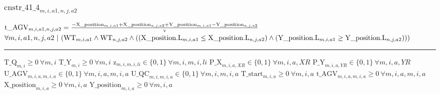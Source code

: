 \documentclass[11pt]{article}
\begin{document}
\subsubsection*{$\text{cnstr\_41\_4}_{m, i, a1, n, j, a2}$} \label{cnstr_41_4}
$
\textcolor{black}{\text{t\_AGV}}_{m, i, a1, n, j, a2} =  \frac{-\textcolor{black}{\text{X\_position}}_{m, i, a1} + \textcolor{black}{\text{X\_position}}_{n, j, a2} + \textcolor{black}{\text{Y\_position}}_{m, i, a1} - \textcolor{black}{\text{Y\_position}}_{n, j, a2}}{\textcolor{black}{\text{v}}} 
$
\hfill
$
\forall{ m, i, a1, n, j, a2}  ~ | ~ ( \textcolor{black}{\text{WT}}_{m, i, a1} \wedge \textcolor{black}{\text{WT}}_{n, j, a2} \wedge  (  ( \textcolor{black}{\text{X\_position.L}}_{m, i, a1}  \leq  \textcolor{black}{\text{X\_position.L}}_{n, j, a2} )  \wedge  ( \textcolor{black}{\text{Y\_position.L}}_{m, i, a1}  \geq  \textcolor{black}{\text{Y\_position.L}}_{n, j, a2} )  ) )
$ \vspace{5pt}
\hrule 
\bigskip
$\text{T\_Q}_{m, i}\geq 0 ~ \forall m, i$ \newline 
$\text{T\_Y}_{m, i}\geq 0 ~ \forall m, i$ \newline 
$\text{z}_{m, i, m, i, li}\in \{0,1\} ~ \forall m, i, m, i, li$ \newline 
$\text{P\_X}_{m, i, a, XR}\in \{0,1\} ~ \forall m, i, a, XR$ \newline 
$\text{P\_Y}_{m, i, a, YR}\in \{0,1\} ~ \forall m, i, a, YR$ \newline 
$\text{U\_AGV}_{m, i, a, m, i, a}\in \{0,1\} ~ \forall m, i, a, m, i, a$ \newline 
$\text{U\_QC}_{m, i, m, i, a}\in \{0,1\} ~ \forall m, i, m, i, a$ \newline 
$\text{T\_start}_{m, i, a}\geq 0 ~ \forall m, i, a$ \newline 
$\text{t\_AGV}_{m, i, a, m, i, a}\geq 0 ~ \forall m, i, a, m, i, a$ \newline 
$\text{X\_position}_{m, i, a}\geq 0 ~ \forall m, i, a$ \newline 
$\text{Y\_position}_{m, i, a}\geq 0 ~ \forall m, i, a$ \newline
\bigskip
\end{document}
